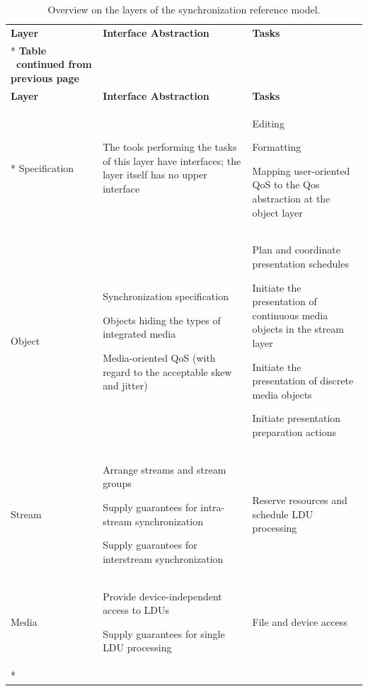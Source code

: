 \begin{landscape}
	\begin{longtable}[c]{@{}p{3cm}p{8cm}p{5cm}@{}}
		\caption{Overview on the layers of the synchronization reference model.}
		\label{tab:sync-reference-model-overview}\\
		\toprule
		\textbf{Layer} & \textbf{Interface Abstraction}                     & \textbf{Tasks}                                                       \\* \midrule
		\endfirsthead
		\multicolumn{3}{c}%
		{{\bfseries Table \thetable\ continued from previous page}} \\
		\toprule
		\textbf{Layer} & \textbf{Interface Abstraction}                     & \textbf{Tasks}                                                       \\* \midrule
		\endhead
		\bottomrule
		\endfoot
		\endlastfoot
Specification &	{The tools performing the tasks of this layer have interfaces; the layer itself has no upper interface\par} & {Editing\par Formatting\par Mapping user-oriented QoS to the Qos abstraction at the object layer\par}\\
	
Object  &{Synchronization specification\par Objects hiding the types of integrated media\par Media-oriented QoS (with regard to the acceptable skew and jitter)\par}  & {Plan and coordinate presentation schedules\par  Initiate the presentation of continuous media objects in the stream layer\par Initiate the presentation of discrete media objects \par Initiate presentation preparation actions }\\

Stream & {Arrange streams and stream groups\par Supply guarantees for intra-stream synchronization\par Supply guarantees for interstream synchronization\par}   & Reserve resources and schedule LDU processing\\
Media  & {Provide device-independent access to LDUs\par Supply guarantees for single LDU processing} & File and device access \\* \bottomrule
	\end{longtable}
\end{landscape}


